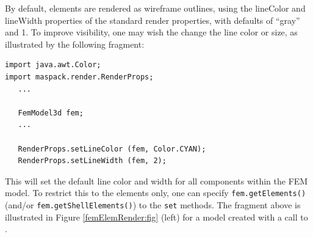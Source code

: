 By default, elements are rendered as wireframe outlines, using the
{\sf lineColor} and {\sf lineWidth} properties of the standard render
properties, with defaults of ``gray'' and 1.  To improve visibility,
one may wish the change the line color or size, as illustrated by the
following fragment:
%
\begin{lstlisting}[]
import java.awt.Color;
import maspack.render.RenderProps;
   ...

   FemModel3d fem;
   ...

   RenderProps.setLineColor (fem, Color.CYAN);
   RenderProps.setLineWidth (fem, 2);
\end{lstlisting}
%
This will set the default line color and width for all components
within the FEM model. To restrict this to the elements only, one can
specify {\tt fem.getElements()} (and/or {\tt fem.getShellElements()})
to the {\tt set} methods. The fragment above is illustrated in
Figure \ref{femElemRender:fig} (left) for a model created with a call to
.


